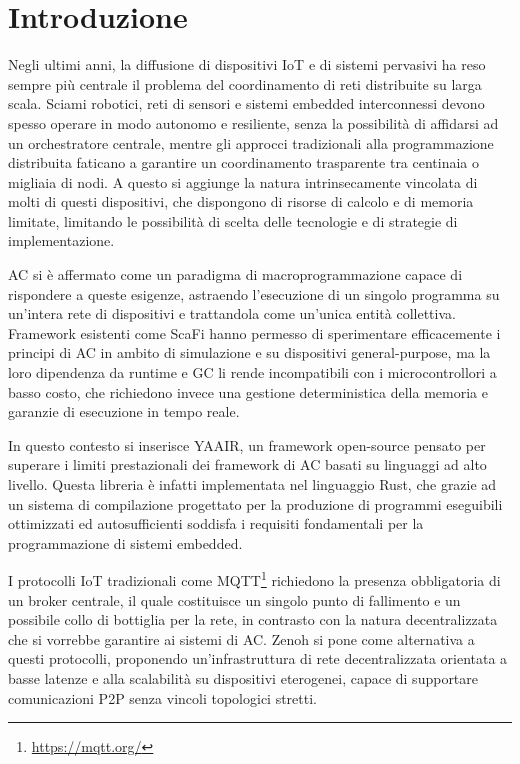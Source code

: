 \chapter{Introduzione}
\label{chap:introduction}

Negli ultimi anni, la diffusione di dispositivi \ac{IoT} e di
sistemi pervasivi ha reso sempre più centrale il problema del coordinamento
di reti distribuite su larga scala. Sciami robotici, reti di sensori e sistemi
embedded interconnessi devono spesso operare in modo autonomo e resiliente,
senza la possibilità di affidarsi ad un orchestratore centrale, mentre gli
approcci tradizionali alla programmazione distribuita faticano a garantire un
coordinamento trasparente tra centinaia o migliaia di nodi. A questo si
aggiunge la natura intrinsecamente vincolata di molti di questi dispositivi,
che dispongono di risorse di calcolo e di memoria limitate, limitando le
possibilità di scelta delle tecnologie e di strategie di implementazione.

\ac{AC} si è affermato come un paradigma di macroprogrammazione capace di rispondere
a queste esigenze, astraendo l'esecuzione di un singolo programma su un'intera rete
di dispositivi e trattandola come un'unica entità collettiva.
Framework esistenti come \ac{ScaFi} hanno permesso di sperimentare efficacemente i
principi di \ac{AC} in ambito di simulazione e su dispositivi general-purpose, ma
la loro dipendenza da runtime e \ac{GC} li rende incompatibili con i
microcontrollori a basso costo, che richiedono invece una gestione deterministica
della memoria e garanzie di esecuzione in tempo reale.

In questo contesto si inserisce \ac{YAAIR}, un framework open-source pensato per
superare i limiti prestazionali dei framework di \ac{AC} basati su linguaggi ad
alto livello.
Questa libreria è infatti implementata nel linguaggio Rust, che grazie ad un sistema
di compilazione progettato per la produzione di programmi eseguibili ottimizzati
ed autosufficienti soddisfa i requisiti fondamentali per la programmazione di
sistemi embedded.

I protocolli \ac{IoT} tradizionali come \ac{MQTT}\footnote{\url{https://mqtt.org/}}
richiedono la presenza obbligatoria di un broker centrale, il quale costituisce
un singolo punto di fallimento e un possibile collo di bottiglia per la rete,
in contrasto con la natura decentralizzata che si vorrebbe garantire ai sistemi
di \ac{AC}.
Zenoh si pone come alternativa a questi protocolli, proponendo un'infrastruttura
di rete decentralizzata orientata a basse latenze e alla scalabilità su dispositivi
eterogenei, capace di supportare comunicazioni \ac{P2P} senza vincoli topologici
stretti.

